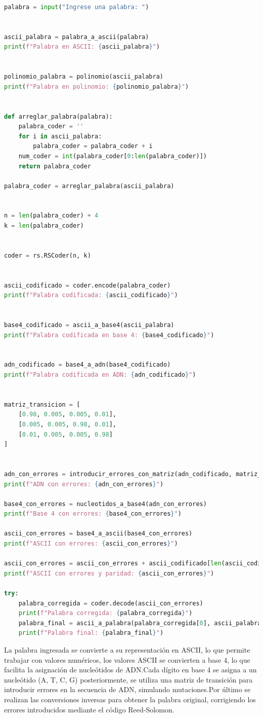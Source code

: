 \begin{lstlisting}[language=Python]
palabra = input("Ingrese una palabra: ")


ascii_palabra = palabra_a_ascii(palabra)
print(f"Palabra en ASCII: {ascii_palabra}")


polinomio_palabra = polinomio(ascii_palabra)
print(f"Palabra en polinomio: {polinomio_palabra}")


def arreglar_palabra(palabra):
    palabra_coder = ''
    for i in ascii_palabra:
        palabra_coder = palabra_coder + i
    num_coder = int(palabra_coder[0:len(palabra_coder)])
    return palabra_coder

palabra_coder = arreglar_palabra(ascii_palabra)


n = len(palabra_coder) + 4
k = len(palabra_coder)


coder = rs.RSCoder(n, k)


ascii_codificado = coder.encode(palabra_coder)
print(f"Palabra codificada: {ascii_codificado}")


base4_codificado = ascii_a_base4(ascii_palabra)
print(f"Palabra codificada en base 4: {base4_codificado}")


adn_codificado = base4_a_adn(base4_codificado)
print(f"Palabra codificada en ADN: {adn_codificado}")


matriz_transicion = [
    [0.98, 0.005, 0.005, 0.01], 
    [0.005, 0.005, 0.98, 0.01], 
    [0.01, 0.005, 0.005, 0.98]   
]


adn_con_errores = introducir_errores_con_matriz(adn_codificado, matriz_transicion)
print(f"ADN con errores: {adn_con_errores}")

base4_con_errores = nucleotidos_a_base4(adn_con_errores)
print(f"Base 4 con errores: {base4_con_errores}")

ascii_con_errores = base4_a_ascii(base4_con_errores)
print(f"ASCII con errores: {ascii_con_errores}")

ascii_con_errores = ascii_con_errores + ascii_codificado[len(ascii_codificado) - 4:len(ascii_codificado)]
print(f"ASCII con errores y paridad: {ascii_con_errores}")

try:
    palabra_corregida = coder.decode(ascii_con_errores)
    print(f"Palabra corregida: {palabra_corregida}")
    palabra_final = ascii_a_palabra(palabra_corregida[0], ascii_palabra)
    print(f"Palabra final: {palabra_final}")
\end{lstlisting}

La palabra ingresada se convierte a su representación en ASCII, lo que permite trabajar con valores numéricos, los valores ASCII se convierten a base 4, lo que facilita la asignación de nucleótidos de ADN.Cada dígito en base 4 se asigna a un nucleótido (A, T, C, G) posteriormente, se utiliza una matriz de transición para introducir errores en la secuencia de ADN, simulando mutaciones.Por último se realizan las conversiones inversas para obtener la palabra original, corrigiendo los errores introducidos mediante el código Reed-Solomon.



